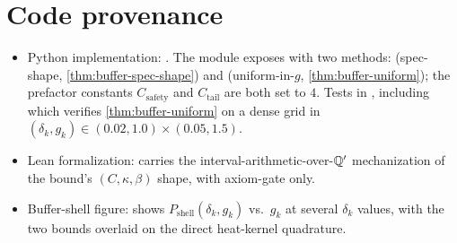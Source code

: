 \section{Code provenance}
\label{sec:buffer-codeanchor}

\begin{itemize}
  \item Python implementation:
    .  The module exposes
     with two methods:
     (spec-shape, \cref{thm:buffer-spec-shape})
    and  (uniform-in-$g$,
    \cref{thm:buffer-uniform}); the prefactor constants
    $C_{\mathrm{safety}}$ and $C_{\mathrm{tail}}$ are both set to
    $4$.  Tests in , including
    which verifies \cref{thm:buffer-uniform} on a dense grid in
    $(\delta_k, g_k) \in (0.02, 1.0) \times (0.05, 1.5)$.
  \item Lean formalization: 
    carries the interval-arithmetic-over-$\mathbb{Q}'$ mechanization of the
    bound's $(C, \kappa, \beta)$ shape, with axiom-gate
    \codepath{[propext]} only.
  \item Buffer-shell figure:
    shows $P_{\mathrm{shell}}(\delta_k, g_k)$ vs.\ $g_k$ at several
    $\delta_k$ values, with the two bounds overlaid on the direct
    heat-kernel quadrature.
\end{itemize}

